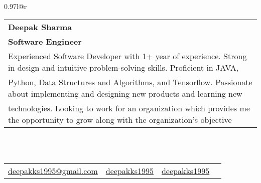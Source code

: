 \documentclass[11pt, a4paper]{article}
\begin{document}
\begin{tabular*}{0.97\textwidth}{l@{\extracolsep{\fill}}r}

\hspace{-18pt}\begin{tabular}{l}
\textbf{{\LARGE {Deepak Sharma}}}
\vspace{1pt} \\
\textbf{\large{\textcolor{secondColor}{Software Engineer}}}
\vspace{2pt} \\
\footnotesize{Experienced Software Developer with 1+ year of experience. Strong in design and intuitive problem-solving skills. Proficient in JAVA,}\\
\footnotesize{Python, Data Structures and Algorithms, and Tensorflow. Passionate about implementing and designing new products and learning new } \\
 \footnotesize{technologies. Looking to work for an organization which provides me the opportunity to grow along with the organization's objective}
\end{tabular}\\
\vspace{5pt}
\hspace{-14pt}\noindent\makebox[\linewidth]{\rule{\paperwidth}{0.1pt}} \\
\hspace{-18pt}\begin{tabular}{cccc}
  \Letter \href{mailto:deepakks1995@gmail.com}{  deepakks1995@gmail.com} &\hspace{55pt}
  \faGithub\href{https://github.com/deepakks1995}{ deepakks1995} &\hspace{55pt}
  \faLinkedin\href{https://www.linkedin.com/in/deepakks1995}{ deepakks1995} &\hspace{55pt}
  \faMobile{ +91-8894054791} 
\end{tabular} \\
\hspace{-14pt}\noindent\makebox[\linewidth]{\rule{\paperwidth}{0.1pt}}

\end{tabular*}
\end{document}

